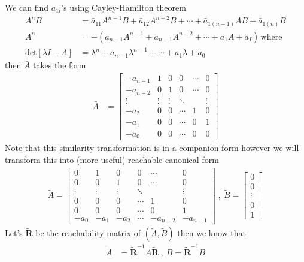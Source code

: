 \documentclass[twoside]{article}
\begin{document}
%
We can find $a_{1i}$'s using Cayley-Hamilton theorem
%
\begin{align*}
A^{n} B &= \bar{a}_{11} A^{n-1} B + \bar{a}_{12} A^{n-2} B + \cdots + \bar{a}_{1(n-1)} A B + \bar{a}_{1(n)} B
\\
A^{n} &= - \left( a_{n-1} A^{n-1} + a_{n-1} A^{n-2} + \cdots + a_1 A + a_ I \right) \, \mathrm{where}
\\
\mathrm{det}[\lambda I - A] &= \lambda^n + a_{n-1}  \lambda^{n-1}
	+ \cdots + a_{1} \lambda + a_0
\end{align*}
then $\bar{A}$ takes the form
\begin{align*}
\bar{A} &= \left[ \begin{array}{c|c|c|c|c|c} 
-a_{n-1} & 1 & 0 & 0 & \cdots & 0 \\
-a_{n-2} & 0 & 1 &  0 & \cdots & 0 \\
\vdots & \vdots & \vdots & \ddots &  & \vdots \\
-a_{2} & 0 & 0 & \cdots  & 1 & 0 \\
-a_{1} & 0 & 0 & \cdots  & 0 & 1 \\
-a_{0} & 0 & 0 & \cdots  & 0 & 0 
\end{array} 
\right] 
\end{align*}
%
Note that this similarity transformation is in a companion form however we will transform this into (more useful) 
reachable canonical form
%
\begin{align*}
\tilde{A} = \left[ \begin{array}{c|c|c|c|c|c} 
0 & 1 & 0 & 0 & \cdots & 0 \\
0 & 0 & 1 &  0 & \cdots & 0 \\
\vdots & \vdots & \vdots & \ddots &  & \vdots \\
0 & 0 & 0 & \cdots  & 1 & 0 \\
0 & 0 & 0 & \cdots  & 0 & 1 \\
-a_{0} & -a_{1} & -a_{2} & \cdots  & -a_{n-2} & -a_{n-1} 
\end{array} 
\right] 
\ , \ \tilde{B} = \begin{bmatrix} 0 \\ 0 \\ \vdots \\ 0 \\ 1 \end{bmatrix}
\end{align*}
%
Let's $\tilde{\mathbf{R}}$ be the reachability matrix of $(\tilde{A} , \tilde{B})$ then we know that 
%
%
\begin{align*}
	\bar{A} &= \tilde{\mathbf{R}}^{-1} A \tilde{\mathbf{R}} \ , \ \bar{B} = \tilde{\mathbf{R}}^{-1} B 
\end{align*}
\end{document}
